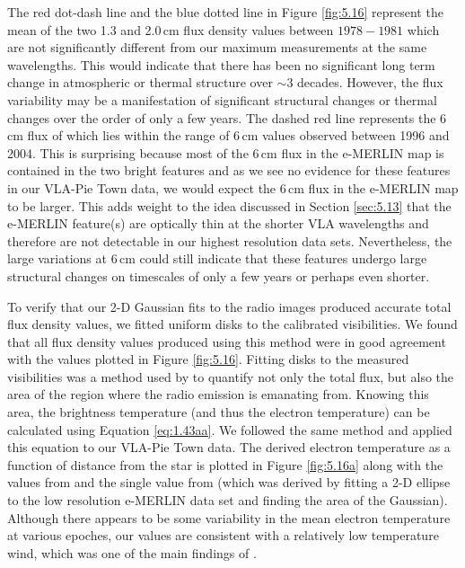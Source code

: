 The red dot-dash line and the blue dotted line in Figure \ref{fig:5.16} represent the mean of the two 1.3 and 2.0\,cm flux density values between $1978-1981$  \citep{newell_1982} which are not significantly different from our maximum measurements at the same wavelengths. This would indicate that there has been no significant long term change in atmospheric or thermal structure over $\sim 3$ decades. However, the flux variability may be a manifestation of significant structural changes or thermal changes over the order of only a few years. The dashed red line represents the 6\,cm flux of \cite{richards_2013} which lies within the range of 6\,cm values observed between 1996 and 2004. This is surprising because most of the 6\,cm flux in the e-MERLIN map is contained in the two bright features and as we see no evidence for these features in our VLA-Pie Town data, we would expect the 6\,cm flux in the e-MERLIN map to be larger. This adds weight to the idea discussed in Section \ref{sec:5.13} that the e-MERLIN feature(s) are optically thin at the shorter VLA wavelengths and therefore are not detectable in our highest resolution data sets. Nevertheless, the large variations at 6\,cm could still indicate that these features undergo large structural changes on timescales of only a few years or perhaps even shorter.

To verify that our 2-D Gaussian fits to the radio images produced accurate total flux density values, we fitted uniform disks to the calibrated visibilities. We found that all flux density values produced using this method were in good agreement with the values plotted in Figure \ref{fig:5.16}. Fitting disks to the measured visibilities was a method used by \cite{lim_1998} to quantify not only the total flux, but also the area of the region where the radio emission is emanating from. Knowing this area, the brightness temperature (and thus the electron temperature) can be calculated using Equation \ref{eq:1.43aa}. We followed the same method and applied this equation to our VLA-Pie Town data. The derived electron temperature as a function of distance from the star is plotted in Figure \ref{fig:5.16a} along with the values from \cite{lim_1998} and the single value from \cite{richards_2013} (which was derived by fitting a 2-D ellipse to the low resolution e-MERLIN data set and finding the area of the Gaussian). Although there appears to be some variability in the mean electron temperature at various epoches, our values are consistent with a relatively low temperature wind, which was one of the main findings of \cite{lim_1998}. 


